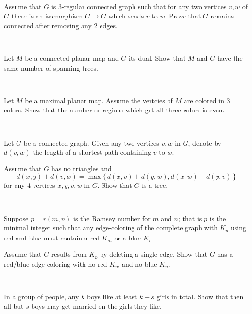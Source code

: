 \documentclass[oneside,a4paper]{article}
\begin{document}
\ 

Assume that $G$ is $3$-regular connected graph such that 
for any two vertices $v,w$ of $G$ there is an isomorphism
$G\to G$ which sends $v$ to $w$.
Prove that $G$ remains connected after removing any $2$ edges.

\ 

Let $M$ be a connected planar map and $G$ its dual.
Show that $M$ and $G$ have the same number of spanning trees.

\ 

Let $M$ be a maximal planar map.
Assume the vertcies of $M$ are colored in 3 colors.
Show that the number or regions which get all three colors is even.

\ 

Let $G$ be a connected graph.
Given any two vertices $v,w$ in $G$, denote by $d(v,w)$ the length of a shortest path containing $v$ to $w$. 

Assume that $G$ has no triangles and
\[d(x,y)+d(v,w)=\max\{\,d(x,v)+d(y,w),d(x,w)+d(y,v)\,\}\]
for any 4 vertices $x,y,v,w$ in $G$.
Show that $G$ is a tree.

\ 

Suppose $p=r(m,n)$ is the Ramsey number for $m$ and $n$;
that is $p$ is the minimal integer such that any edge-coloring of the
complete graph with $K_p$ using red and blue must contain a red $K_m$ or a blue $K_n$.

Assume that $G$ results from $K_p$ by deleting a single edge.
Show that $G$ has a red/blue edge coloring with no red
$K_m$ and no blue $K_n$.

\ 

 In a group of people, any $k$ boys like at least $k-s$ girls in total.
Show that then all but $s$ boys may get married on the girls they like.
\end{document}

